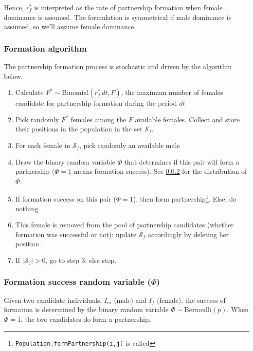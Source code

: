 \documentclass[11pt, onecolumn]{article}
\newcommand{\ttt}[1]{\texttt{#1}}
\begin{document}
Hence, $r^*_f$ is interpreted as the rate of partnership formation when female dominance is assumed. The formulation is symmetrical if male dominance is assumed, so we'll assume female dominance.


\subsubsection{Formation algorithm}

The partnership formation process is stochastic and driven by the algorithm below. 

\begin{enumerate}

\item Calculate $F^* \sim\text{Binomial}(r^*_f\,dt, F)$, the maximum number of females  candidate for partnership formation during the period $dt$

\item Pick randomly $F^*$ females among the $F$ available females. Collect and store their positions in the population in the set $\mathcal{S}_f$. 

\item For each female in $\mathcal{S}_f$, pick randomly an available male 

\item Draw the binary random variable $\Phi$ that determines if this pair will form a partnership ($\Phi=1$ means formation success). See \ref{formationSuccessFormula} for the  distribution of $\Phi$.

\item If formation success on this pair ($\Phi=1$), then form partnership\footnote{\ttt{Population.formPartnership(i,j)} is called}. Else, do nothing.
\item This female is removed from the pool of partnership candidates (whether formation was successful or not): update $\mathcal{S}_f$ accordingly by deleting her position.
\item If $|\mathcal{S}_f|>0$, go to step 3; else stop.
\end{enumerate}


\subsubsection{Formation success random variable ($\Phi$)}
\label{formationSuccessFormula}
Given two candidate individuals, $I_m$ (male) and $I_f$ (female), the success of formation is determined by the binary random variable $\Phi\sim\mathrm{Bernoulli}(p)$. When $\Phi=1$, the two candidates do form a partnership.
\end{document}
